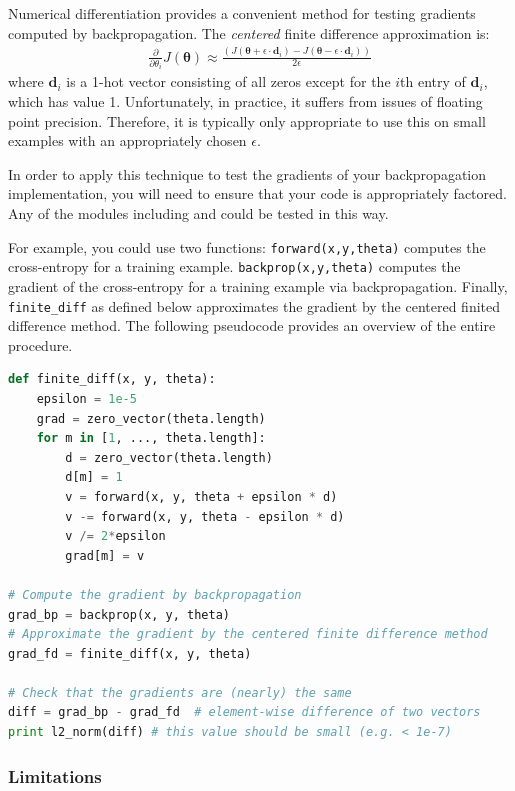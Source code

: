 \documentclass[11pt]{exam}
\numberwithin{equation}{section} %
\numberwithin{figure}{section} %
\numberwithin{table}{section} %
\newcommand{\vc}[1]{\boldsymbol{#1}}
\begin{document}
Numerical differentiation provides a convenient method for testing
gradients computed by backpropagation. The \emph{centered}
finite difference approximation is:
\begin{align}
\frac{\partial}{\partial \theta_i} J(\vc{\theta}) \approx \frac{\left( J(\vc{\theta} + \epsilon \cdot \vc{d}_i) - J(\vc{\theta} - \epsilon \cdot \vc{d}_i) \right)}{2\epsilon} 
\end{align}
where $\vc{d}_i$ is a 1-hot vector consisting of all zeros except for
the $i$th entry of $\vc{d}_i$, which has value 1.  Unfortunately, in
practice, it suffers from issues of floating point
precision. Therefore, it is typically only appropriate to use this on
small examples with an appropriately chosen $\epsilon$.

In order to apply this technique to test the gradients of your backpropagation implementation, you will need to ensure that your code is appropriately factored. Any of the modules including  and  could be tested in this way.
%

For example, you could use two functions: \lstinline{forward(x,y,theta)} computes the cross-entropy for a training example. \lstinline{backprop(x,y,theta)} computes the gradient of the cross-entropy for a training example via backpropagation. Finally, \lstinline{finite_diff} as defined below approximates the gradient by the centered finited difference method. The following pseudocode provides an overview of the entire procedure.

\begin{lstlisting}[language=Python]
def finite_diff(x, y, theta):
    epsilon = 1e-5
    grad = zero_vector(theta.length)
    for m in [1, ..., theta.length]:
        d = zero_vector(theta.length)
        d[m] = 1
        v = forward(x, y, theta + epsilon * d)
        v -= forward(x, y, theta - epsilon * d)
        v /= 2*epsilon
        grad[m] = v
        
# Compute the gradient by backpropagation
grad_bp = backprop(x, y, theta)
# Approximate the gradient by the centered finite difference method
grad_fd = finite_diff(x, y, theta)

# Check that the gradients are (nearly) the same
diff = grad_bp - grad_fd  # element-wise difference of two vectors
print l2_norm(diff) # this value should be small (e.g. < 1e-7)
\end{lstlisting}

\subsubsection{Limitations}
\end{document}
